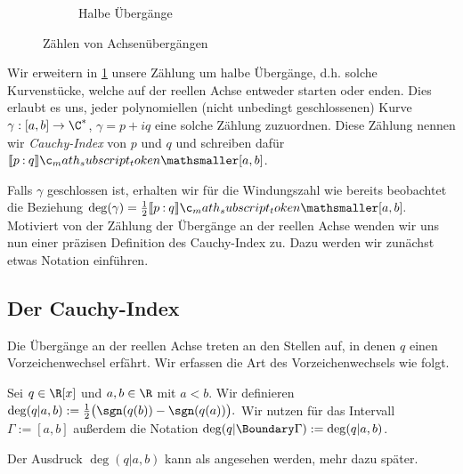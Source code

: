 \documentclass{mythesis}
\begin{document}
\begin{figure}[ht]
    \begin{subfigure}[t]{0.49\textwidth}
        \centering
        \caption{Halbe Übergänge}
        \label{fig:curve_counting_half}
    \end{subfigure}
    \caption{Zählen von Achsenübergängen}
    \label{fig:curve_counting}
\end{figure}

Wir erweitern in \ref{fig:curve_counting_half} unsere Zählung um halbe Übergänge, d.h. solche Kurvenstücke, welche auf der reellen Achse entweder starten oder enden.
Dies erlaubt es uns, jeder polynomiellen (nicht unbedingt geschlossenen) Kurve $\gamma: [a,b] \to \C^*$, $\gamma = p + iq$ eine solche Zählung zuzuordnen.
Diese Zählung nennen wir \emph{Cauchy-Index} von $p$ und $q$ und schreiben dafür $\Index{[a,b]}{p}{q}$.

Falls $\gamma$ geschlossen ist, erhalten wir für die Windungszahl wie bereits beobachtet die Beziehung
\begin{math}
    \deg(\gamma) = \frac{1}{2} \Index{[a,b]}{p}{q}.
\end{math}
Motiviert von der Zählung der Übergänge an der reellen Achse wenden wir uns nun einer präzisen Definition des Cauchy-Index zu.
Dazu werden wir zunächst etwas Notation einführen.



\subsection{Der Cauchy-Index}

Die Übergänge an der reellen Achse treten an den Stellen auf, in denen $q$ einen Vorzeichenwechsel erfährt.
Wir erfassen die Art des Vorzeichenwechsels wie folgt.

\begin{definition}
    Sei $q \in \R[x]$ und $a, b \in \R$ mit $a < b$.
    Wir definieren
    \begin{math}
        \deg(q|a,b) := \frac{1}{2} \big(\sgn(q(b)) - \sgn(q(a)) \big).
    \end{math}
    Wir nutzen für das Intervall $\Gamma := [a,b]$ außerdem die Notation $\deg(q|\Boundary\Gamma) := \deg(q|a,b)$.
    \begin{note}
        Der Ausdruck $\deg(q|a,b)$ kann als  angesehen werden, mehr dazu später.
    \end{note}
\end{definition}
\end{document}
